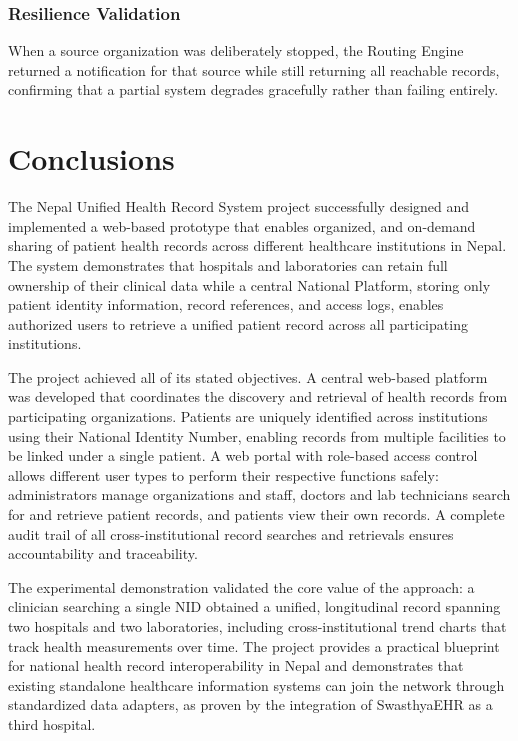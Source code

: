 \documentclass[12pt]{report}
\numberwithin{equation}{chapter}
\begin{document}
\subsection{Resilience Validation}
When a source organization was deliberately stopped, the Routing Engine returned a notification for that source while still returning all reachable records, confirming that a partial system degrades gracefully rather than failing entirely.

\chapter{Conclusions}
The Nepal Unified Health Record System project successfully designed and implemented a web-based prototype that enables organized, and on-demand sharing of patient health records across different healthcare institutions in Nepal. The system demonstrates that hospitals and laboratories can retain full ownership of their clinical data while a central National Platform, storing only patient identity information, record references, and access logs, enables authorized users to retrieve a unified patient record across all participating institutions.

The project achieved all of its stated objectives. A central web-based platform was developed that coordinates the discovery and retrieval of health records from participating organizations. Patients are uniquely identified across institutions using their National Identity Number, enabling records from multiple facilities to be linked under a single patient. A web portal with role-based access control allows different user types to perform their respective functions safely: administrators manage organizations and staff, doctors and lab technicians search for and retrieve patient records, and patients view their own records. A complete audit trail of all cross-institutional record searches and retrievals ensures accountability and traceability.

The experimental demonstration validated the core value of the approach: a clinician searching a single NID obtained a unified, longitudinal record spanning two hospitals and two laboratories, including cross-institutional trend charts that track health measurements over time. The project provides a practical blueprint for national health record interoperability in Nepal and demonstrates that existing standalone healthcare information systems can join the network through standardized data adapters, as proven by the integration of SwasthyaEHR as a third hospital.
\end{document}
